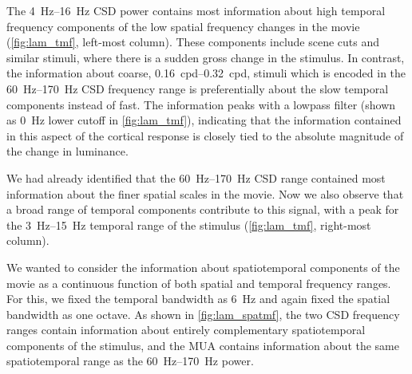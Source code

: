 The \SIrange{4}{16}{Hz} \ac{CSD} power contains most information about high temporal frequency components of the low spatial frequency changes in the movie (\autoref{fig:lam_tmf}, left-most column).
These components include scene cuts and similar stimuli, where there is a sudden gross change in the stimulus.
In contrast, the information about coarse, \SIrange{0.16}{0.32}{cpd}, stimuli which is encoded in the \SIrange{60}{170}{Hz} \ac{CSD} frequency range is preferentially about the slow temporal components instead of fast.
The information peaks with a lowpass filter (shown as \SI{0}{Hz} lower cutoff in \autoref{fig:lam_tmf}), indicating that the information contained in this aspect of the cortical response is closely tied to the absolute magnitude of the change in luminance.

We had already identified that the \SIrange{60}{170}{Hz} \ac{CSD} range contained most information about the finer spatial scales in the movie.
Now we also observe that a broad range of temporal components contribute to this signal, with a peak for the \SIrange{3}{15}{Hz} temporal range of the stimulus (\autoref{fig:lam_tmf}, right-most column).


We wanted to consider the information about spatiotemporal components of the movie as a continuous function of both spatial and temporal frequency ranges.
For this, we fixed the temporal bandwidth as \SI{6}{Hz} and again fixed the spatial bandwidth as one octave.
As shown in \autoref{fig:lam_spatmf}, the two \ac{CSD} frequency ranges contain information about entirely complementary spatiotemporal components of the stimulus, and the \ac{MUA} contains information about the same spatiotemporal range as the \SIrange{60}{170}{Hz} power.

